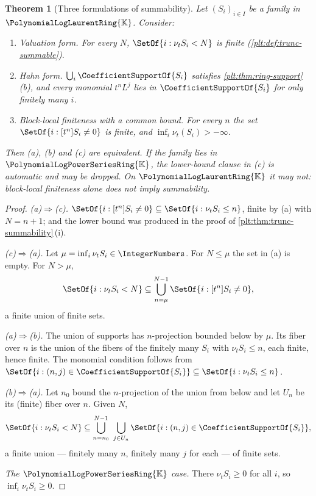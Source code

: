 \documentclass[11pt,oneside]{article}
\theoremstyle{plain}
\newtheorem{theorem}{Theorem}[section]
\theoremstyle{definition}
\theoremstyle{remark}
\newcommand{\K}{\mathbb{K}}
\newcommand{\PLpow}{\PolynomialLogPowerSeriesRing{\K}}   %
\newcommand{\PLlau}{\PolynomialLogLaurentRing{\K}}       %
\newcommand{\ordt}{\nu_{t}}                              %
\begin{document}
\begin{theorem}[Three formulations of summability]
\label{plt:thm:trunc-summability-criterion}
Let \((S_i)_{i\in I}\) be a family in \(\PLlau\).  Consider:
\begin{enumerate}[label=\textup{(\alph*)}]
\item \emph{Valuation form.}  For every \(N\), \(\SetOf{i:\ordt S_i<N}\) is
  finite \textup{(}\cref{plt:def:trunc-summable}\textup{)}.
\item \emph{Hahn form.}  \(\bigcup_i\CoefficientSupportOf{S_i}\) satisfies
  \cref{plt:thm:ring-support}\,(b), and every monomial \(t^nL^j\) lies in
  \(\CoefficientSupportOf{S_i}\) for only finitely many \(i\).
\item \emph{Block-local finiteness with a common bound.}  For every \(n\) the
  set \(\SetOf{i:[t^n]S_i\ne0}\) is finite, and
  \(\inf_i\ordt(S_i)>-\infty\).
\end{enumerate}
Then \textup{(a)}, \textup{(b)} and \textup{(c)} are equivalent.  If the family
lies in \(\PLpow\), the lower-bound clause in \textup{(c)} is automatic and may
be dropped.  On \(\PLlau\) it may not: block-local finiteness alone does not
imply summability.
\end{theorem}

\begin{proof}
\emph{(a)\(\Rightarrow\)(c).}  \(\SetOf{i:[t^n]S_i\ne0}\subseteq
\SetOf{i:\ordt S_i\le n}\), finite by (a) with \(N=n+1\); and the lower bound
was produced in the proof of
\cref{plt:thm:trunc-summability}\,(i).

\emph{(c)\(\Rightarrow\)(a).}  Let \(\mu=\inf_i\ordt S_i\in\IntegerNumbers\).
For \(N\le\mu\) the set in (a) is empty.  For \(N>\mu\),
\[
  \SetOf{i:\ordt S_i<N}
  \subseteq\bigcup_{n=\mu}^{N-1}\SetOf{i:[t^n]S_i\ne0},
\]
a finite union of finite sets.

\emph{(a)\(\Rightarrow\)(b).}  The union of supports has \(n\)-projection
bounded below by \(\mu\).  Its fiber over \(n\) is the union of the fibers of
the finitely many \(S_i\) with \(\ordt S_i\le n\), each finite, hence finite.
The monomial condition follows from
\(\SetOf{i:(n,j)\in\CoefficientSupportOf{S_i}}\subseteq\SetOf{i:\ordt S_i\le
n}\).

\emph{(b)\(\Rightarrow\)(a).}  Let \(n_0\) bound the \(n\)-projection of the
union from below and let \(U_n\) be its (finite) fiber over \(n\).  Given
\(N\),
\[
  \SetOf{i:\ordt S_i<N}
  \subseteq\bigcup_{n=n_0}^{N-1}\ \bigcup_{j\in U_n}
    \SetOf{i:(n,j)\in\CoefficientSupportOf{S_i}},
\]
a finite union --- finitely many \(n\), finitely many \(j\) for each --- of
finite sets.

\emph{The \(\PLpow\) case.}  There \(\ordt S_i\ge0\) for all \(i\), so
\(\inf_i\ordt S_i\ge0\).
\end{proof}
\end{document}
